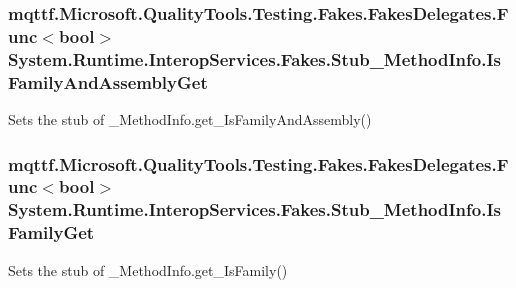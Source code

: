 \hypertarget{class_system_1_1_runtime_1_1_interop_services_1_1_fakes_1_1_stub___method_info_a595e67b56b26bd39d2da0344130cba43}{
\subsubsection[{Is\-Family\-And\-Assembly\-Get}]{\setlength{\rightskip}{0pt plus 5cm}mqttf.\-Microsoft.\-Quality\-Tools.\-Testing.\-Fakes.\-Fakes\-Delegates.\-Func$<$bool$>$ System.\-Runtime.\-Interop\-Services.\-Fakes.\-Stub\-\_\-\-Method\-Info.\-Is\-Family\-And\-Assembly\-Get}}\label{class_system_1_1_runtime_1_1_interop_services_1_1_fakes_1_1_stub___method_info_a595e67b56b26bd39d2da0344130cba43}


Sets the stub of \-\_\-\-Method\-Info.\-get\-\_\-\-Is\-Family\-And\-Assembly()

\hypertarget{class_system_1_1_runtime_1_1_interop_services_1_1_fakes_1_1_stub___method_info_a22bed28cb3e18441b6bdcdbfa12c15c1}{
\subsubsection[{Is\-Family\-Get}]{\setlength{\rightskip}{0pt plus 5cm}mqttf.\-Microsoft.\-Quality\-Tools.\-Testing.\-Fakes.\-Fakes\-Delegates.\-Func$<$bool$>$ System.\-Runtime.\-Interop\-Services.\-Fakes.\-Stub\-\_\-\-Method\-Info.\-Is\-Family\-Get}}\label{class_system_1_1_runtime_1_1_interop_services_1_1_fakes_1_1_stub___method_info_a22bed28cb3e18441b6bdcdbfa12c15c1}


Sets the stub of \-\_\-\-Method\-Info.\-get\-\_\-\-Is\-Family()

